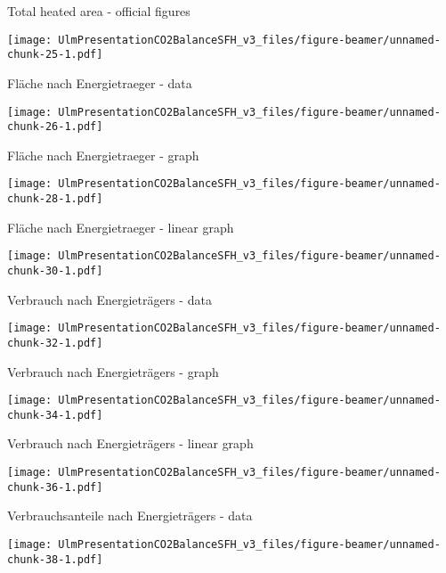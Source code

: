 \documentclass[ignorenonframetext,]{beamer}
\begin{document}
\begin{frame}{Total heated area - official figures}

\texttt{[image: UlmPresentationCO2BalanceSFH\_v3\_files/figure-beamer/unnamed-chunk-25-1.pdf]}

\end{frame}

\begin{frame}{Fläche nach Energietraeger - data}

\texttt{[image: UlmPresentationCO2BalanceSFH\_v3\_files/figure-beamer/unnamed-chunk-26-1.pdf]}

\end{frame}

\begin{frame}{Fläche nach Energietraeger - graph}

\texttt{[image: UlmPresentationCO2BalanceSFH\_v3\_files/figure-beamer/unnamed-chunk-28-1.pdf]}

\end{frame}

\begin{frame}{Fläche nach Energietraeger - linear graph}

\texttt{[image: UlmPresentationCO2BalanceSFH\_v3\_files/figure-beamer/unnamed-chunk-30-1.pdf]}

\end{frame}

\begin{frame}{Verbrauch nach Energieträgers - data}

\texttt{[image: UlmPresentationCO2BalanceSFH\_v3\_files/figure-beamer/unnamed-chunk-32-1.pdf]}

\end{frame}

\begin{frame}{Verbrauch nach Energieträgers - graph}

\texttt{[image: UlmPresentationCO2BalanceSFH\_v3\_files/figure-beamer/unnamed-chunk-34-1.pdf]}

\end{frame}

\begin{frame}{Verbrauch nach Energieträgers - linear graph}

\texttt{[image: UlmPresentationCO2BalanceSFH\_v3\_files/figure-beamer/unnamed-chunk-36-1.pdf]}

\end{frame}

\begin{frame}{Verbrauchsanteile nach Energieträgers - data}

\texttt{[image: UlmPresentationCO2BalanceSFH\_v3\_files/figure-beamer/unnamed-chunk-38-1.pdf]}

\end{frame}
\end{document}
